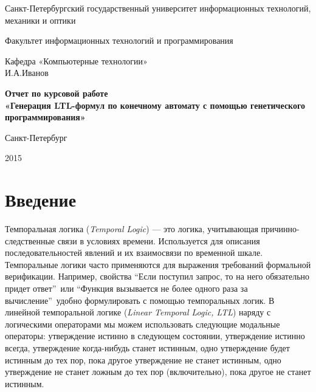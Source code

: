 \documentclass[12pt,fleqn]{article}
\begin{document}
\begin{titlepage}

\begin{center}
{\large
Санкт-Петербургский государственный университет информационных технологий, механики и оптики

Факультет информационных технологий и программирования

Кафедра «Компьютерные технологии»\\[3cm]

И.А.Иванов\\[2cm]}

{\large \bfseries
Отчет по курсовой работе\\[0.5cm]

«Генерация LTL-формул по конечному автомату с помощью генетического программирования»
}
\vfill

Санкт-Петербург

2015
\end{center}

\end{titlepage}

\tableofcontents

\section{Введение}

Темпоральная логика (\emph{Temporal Logic}) --- это логика, учитывающая причинно-следственные связи в условиях времени.
Используется для описания последовательностей явлений и их взаимосвязи по временной шкале.
Темпоральные логики часто применяются для выражения требований формальной верификации.
Например, свойства ``Если поступил запрос, то на него обязательно придет ответ''\ или
``Функция вызывается не более одного раза за вычисление''\ удобно формулировать с помощью темпоральных логик.
В линейной темпоральной логике (\emph{Linear Temporal Logic, LTL}) наряду с логическими операторами мы можем 
использовать следующие модальные операторы: утверждение истинно в следующем состоянии,
утверждение истинно всегда, утверждение когда-нибудь станет истинным,
одно утверждение будет истинным до тех пор, пока другое утверждение не станет истинным,
одно утверждение не станет ложным до тех пор (включительно), пока другое не станет истинным.
\end{document}
